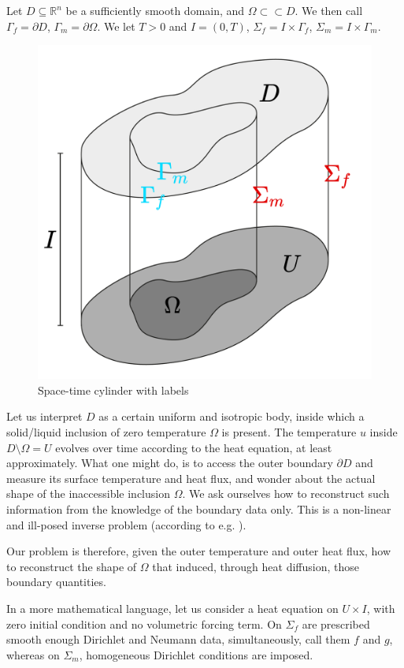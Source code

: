 \documentclass[english,a4paper,9pt,oneside]{scrbook}	%
\theoremstyle{break}
\theoremstyle{remark}
\newcommand{\mR}{\mathbb{R}}
\newcommand{\cc}{\subset\subset}
\begin{document}
Let $D\subseteq\mR^n$ be a sufficiently smooth domain, and $\Omega \cc D$. We then call $\Gamma_f=\partial D$, $\Gamma_m = \partial \Omega$. We let $T>0$ and $I = (0,T)$, $\Sigma_f=I\times \Gamma_f$, $\Sigma_m=I\times \Gamma_m$.

\begin{figure}[H]
\centering
\includegraphics[width=0.25\columnwidth]{Images/Domains.pdf}
\caption{Space-time cylinder with labels}\label{fig:space_time}
\end{figure}

Let us interpret $D$ as a certain uniform and isotropic body, inside which a solid/liquid inclusion of zero temperature $\Omega$ is present. The temperature $u$ inside $D\setminus \Omega = U$ evolves over time according to the heat equation, at least approximately. What one might do, is to access the outer boundary $\partial D$ and measure its surface temperature and heat flux, and wonder about the actual shape of the inaccessible inclusion $\Omega$. We ask ourselves how to reconstruct such information from the knowledge of the boundary data only. This is a non-linear and ill-posed inverse problem (according to e.g. \cite{harbrecht}). 

Our problem is therefore, given the outer temperature and outer heat flux, how to reconstruct the shape of $\Omega$ that induced, through heat diffusion, those boundary quantities.

In a more mathematical language, let us consider a heat equation on $U\times I$, with zero initial condition and no volumetric forcing term. On $\Sigma_f$ are prescribed smooth enough Dirichlet and Neumann data, simultaneously, call them $f$ and $g$, whereas on $\Sigma_m$, homogeneous Dirichlet conditions are imposed.
\end{document}
